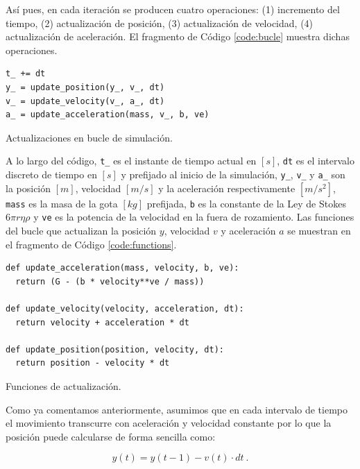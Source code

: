 \documentclass[journal]{IEEEtran}
\newenvironment{code}{\captionsetup{type=listing}}{\par\addvspace{\baselineskip}}
\begin{document}
Así pues, en cada iteración se producen cuatro operaciones: (1) incremento del tiempo, (2) actualización de posición, (3) actualización de velocidad, (4) actualización de aceleración. El fragmento de Código \ref{code:bucle} muestra dichas operaciones.

\bigskip

\begin{code}
  \begin{verbatim}
t_ += dt
y_ = update_position(y_, v_, dt)
v_ = update_velocity(v_, a_, dt)
a_ = update_acceleration(mass, v_, b, ve)
  \end{verbatim}
  \caption{Actualizaciones en bucle de simulación.}
  \label{code:bucle}
\end{code}

A lo largo del código, \texttt{t_} es el instante de tiempo actual en $[s]$, \texttt{dt} es el intervalo discreto de tiempo en $[s]$ y prefijado al inicio de la simulación, \texttt{y_}, \texttt{v_} y \texttt{a_} son la posición $[m]$, velocidad $[m/s]$ y la aceleración respectivamente $[m/s^2]$, \texttt{mass} es la masa de la gota $[kg]$ prefijada, \texttt{b} es la constante de la Ley de Stokes
$6\pi r\eta\rho$ y \texttt{ve} es la potencia de la velocidad en la fuera de rozamiento. Las funciones del bucle que actualizan la posición $y$, velocidad $v$ y aceleración $a$ se muestran en el fragmento de Código \ref{code:functions}.

\bigskip

\begin{code}
	\begin{verbatim}
def update_acceleration(mass, velocity, b, ve):
  return (G - (b * velocity**ve / mass))

def update_velocity(velocity, acceleration, dt):
  return velocity + acceleration * dt

def update_position(position, velocity, dt):
  return position - velocity * dt
	\end{verbatim}
  \caption{Funciones de actualización.}
  \label{code:functions}
\end{code}

Como ya comentamos anteriormente, asumimos que en cada intervalo de tiempo el movimiento transcurre con aceleración y velocidad constante por lo que la posición puede calcularse de forma sencilla como:

\begin{equation}
  y(t) = y(t-1) - v(t) \cdot dt~.
\end{equation}
\end{document}
